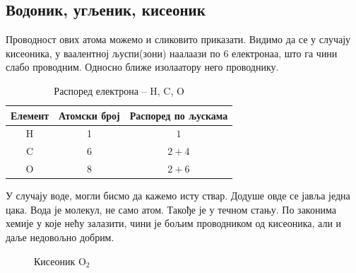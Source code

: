 \documentclass{article}
\begin{document}
\subsection{Водоник, угљеник, кисеоник}

Проводност ових атома можемо и сликовито приказати. Видимо да се у случају кисеоника, у ваалентној љуспи(зони) наалаази по 6 електронаа, што га чини слабо проводним. Односно ближе изолаатору него проводнику.

\begin{table}[H]
    \centering
    \begin{tabular}{|c|c|c|}
        \hline
        Елемент & Атомски број & Распоред по љускама \\
        \hline
        H & 1 & $1$ \\
        C & 6 & $2+4$ \\
        O & 8 & $2+6$ \\
        \hline
    \end{tabular}
    \caption{Распоред електрона -- H, C, O}
    \label{tab:hco}
\end{table}

У случају воде, могли бисмо да кажемо исту ствар. Додуше овде се јавља једна цака. Вода је молекул, не само атом. Такође је у течном стању. По законима хемије  у које нећу залазити, чини је бољим проводником од кисеоника, али и даље недовољно добрим.

\begin{figure}[H]
    \centering
    \caption{Кисеоник $\mathrm{O_2}$}
    \label{fig:o2}
\end{figure}
\end{document}
